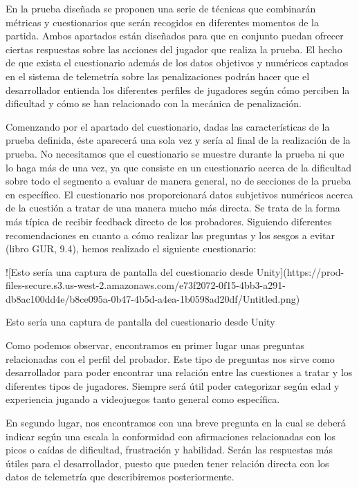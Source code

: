 En la prueba diseñada se proponen una serie de técnicas que combinarán métricas y cuestionarios que serán recogidos en diferentes momentos de la partida. Ambos apartados están diseñados para que en conjunto puedan ofrecer ciertas respuestas sobre las acciones del jugador que realiza la prueba. El hecho de que exista el cuestionario además de los datos objetivos y numéricos captados en el sistema de telemetría sobre las penalizaciones podrán hacer que el desarrollador entienda los diferentes perfiles de jugadores según cómo perciben la dificultad y cómo se han relacionado con la mecánica de penalización.

Comenzando por el apartado del cuestionario, dadas las características de la prueba definida, éste aparecerá una sola vez y sería al final de la realización de la prueba. No necesitamos que el cuestionario se muestre durante la prueba ni que lo haga más de una vez, ya que consiste en un cuestionario acerca de la dificultad sobre todo el segmento a evaluar de manera general, no de secciones de la prueba en específico. El cuestionario nos proporcionará datos subjetivos numéricos acerca de la cuestión a tratar de una manera mucho más directa. Se trata de la forma más típica de recibir feedback directo de los probadores. Siguiendo diferentes recomendaciones en cuanto a cómo realizar las preguntas y los sesgos a evitar (libro GUR, 9.4), hemos realizado el siguiente cuestionario:

![Esto sería una captura de pantalla del cuestionario desde Unity](https://prod-files-secure.s3.us-west-2.amazonaws.com/e73f2072-0f15-4bb3-a291-db8ac100dd4e/b8ce095a-0b47-4b5d-a4ea-1b0598ad20df/Untitled.png)

Esto sería una captura de pantalla del cuestionario desde Unity

Como podemos observar, encontramos en primer lugar unas preguntas relacionadas con el perfil del probador. Este tipo de preguntas nos sirve como desarrollador para poder encontrar una relación entre las cuestiones a tratar y los diferentes tipos de jugadores. Siempre será útil poder categorizar según edad y experiencia jugando a videojuegos tanto general como específica. 

En segundo lugar, nos encontramos con una breve pregunta en la cual se deberá indicar según una escala la conformidad con afirmaciones relacionadas con los picos o caídas de dificultad, frustración y habilidad. Serán las respuestas más útiles para el desarrollador, puesto que pueden tener relación directa con los datos de telemetría que describiremos posteriormente.

